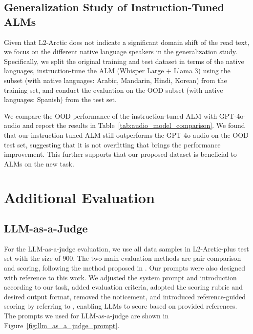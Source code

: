 \documentclass[11pt]{article}
\begin{document}
\subsection{Generalization Study of Instruction-Tuned ALMs}
Given that L2-Arctic does not indicate a significant domain shift of the read text, we focus on the different native language speakers in the generalization study. Specifically, we split the original training and test dataset in terms of the native languages, instruction-tune the ALM (Whisper Large + Llama 3) using the subset (with native languages: Arabic, Mandarin, Hindi, Korean) from the training set, and conduct the evaluation on the OOD subset (with native languages: Spanish) from the test set.


We compare the OOD performance of the instruction-tuned ALM with GPT-4o-audio and report the results in Table~\ref{tab:audio_model_comparison}. We found that our instruction-tuned ALM still outperforms the GPT-4o-audio on the OOD test set, suggesting that it is not overfitting that brings the performance improvement. This further supports that our proposed dataset is beneficial to ALMs on the new task. 



\section{Additional Evaluation}


\subsection{LLM-as-a-Judge}
\label{app:llm_as_a_judge}

For the LLM-as-a-judge evaluation, we use all data samples in L2-Arctic-plus test set with the size of 900. The two main evaluation methods are pair comparison and scoring, following the method proposed in \citet{chen2024mllmasajudge}. Our prompts were also designed with reference to this work. We adjusted the system prompt and introduction according to our task, added evaluation criteria, adopted the scoring rubric and desired output format, removed the noticement, and introduced reference-guided scoring by referring to \citet{zheng2023judging}, enabling LLMs to score based on provided references. The prompts we used for LLM-as-a-judge are shown in Figure~\ref{fig:llm_as_a_judge_prompt}.

\end{document}

